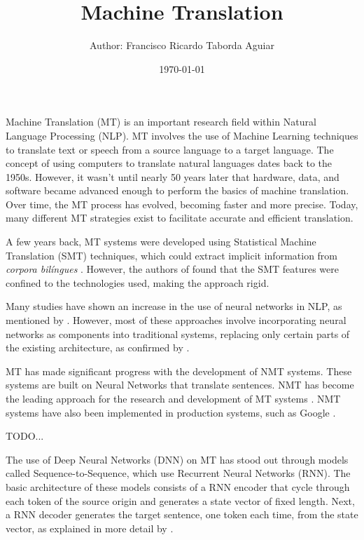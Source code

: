 \documentclass[a4paper]{article}
\title{
    Machine Translation\\
}
\author{
    \small{Author: Francisco Ricardo Taborda Aguiar}\\
}
\date{\today}
\begin{document}
    \maketitle

    Machine Translation (MT) is an important research field within 
    Natural Language Processing (NLP). MT involves the use of Machine 
    Learning techniques to translate text or speech from a source 
    language to a target language. The concept of using computers 
    to translate natural languages dates back to the 1950s. 
    However, it wasn't until nearly 50 years later that hardware, 
    data, and software became advanced enough to perform the basics 
    of machine translation. Over time, the MT process has evolved, 
    becoming faster and more precise. Today, many different MT 
    strategies exist to facilitate accurate and efficient translation.

    A few years back, MT systems were developed using Statistical Machine 
    Translation (SMT) techniques, which could extract implicit information 
    from \emph{corpora bil\'ingues} \cite{brown:1993}. However, the authors 
    of \cite{maruf:2021} found that the SMT features were confined to the 
    technologies used, making the approach rigid.

    Many studies have shown an increase in the use of neural networks in 
    NLP, as mentioned by \cite{goldberg:2016}. However, most of these 
    approaches involve incorporating neural networks as components into 
    traditional systems, replacing only certain parts of the existing 
    architecture, as confirmed by \cite{stahlberg:2020}.

    MT has made significant progress with the development of NMT systems. 
    These systems are built on Neural Networks that translate sentences. 
    NMT has become the leading approach for the research and development 
    of MT systems \cite{tan:2020}. NMT systems have also been implemented 
    in production systems, such as Google \cite{wu:2016}.



    TODO...

    The use of Deep Neural Networks (DNN) on MT has stood out through 
    models called Sequence-to-Sequence, which use Recurrent Neural Networks
    (RNN). The basic architecture of these models consists of a RNN encoder
    that cycle through each token of the source origin and generates a 
    state vector of fixed length.
    Next, a RNN decoder generates the target sentence, one token each time,
    from the state vector, as explained in more detail by \cite{sutskever:2014}.
\end{document}
